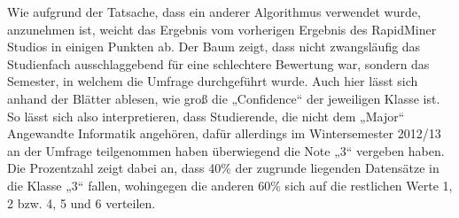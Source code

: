 Wie aufgrund der Tatsache, dass ein anderer Algorithmus verwendet wurde,
anzunehmen ist, weicht das Ergebnis vom vorherigen Ergebnis des RapidMiner
Studios in einigen Punkten ab. Der Baum zeigt, dass nicht zwangsläufig das
Studienfach ausschlaggebend für eine schlechtere Bewertung war, sondern das
Semester, in welchem die Umfrage durchgeführt wurde.
Auch hier lässt sich anhand der Blätter ablesen, wie groß die „Confidence“ der
jeweiligen Klasse ist. So lässt sich also interpretieren, dass Studierende, die
nicht dem „Major“ Angewandte Informatik angehören, dafür allerdings im
Wintersemester 2012/13 an der Umfrage teilgenommen haben überwiegend die Note
„3“ vergeben haben. Die Prozentzahl zeigt dabei an, dass 40\% der zugrunde
liegenden Datensätze in die Klasse „3“ fallen, wohingegen die anderen 60\%
sich auf die restlichen Werte 1, 2 bzw. 4, 5 und 6 verteilen.
